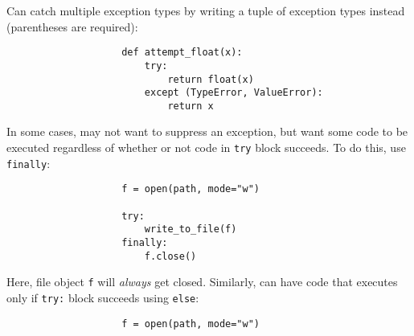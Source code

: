 \documentclass{article}
\begin{document}
\begin{enumerate}
\begin{itemize}
\begin{itemize}
\begin{itemize}
\begin{verbatim}
				\end{verbatim}
				Can catch multiple exception types by writing a tuple of exception types instead (parentheses are required):
				\begin{verbatim}
					def attempt_float(x):
					    try:
					        return float(x)
					    except (TypeError, ValueError):
					        return x
				\end{verbatim}
				In some cases, may not want to suppress an exception, but want some code to be executed regardless of whether or not code in {\tt try} block succeeds. To do this, use {\tt finally}:
				\begin{verbatim}
					f = open(path, mode="w")
					
					try:
					    write_to_file(f)
					finally:
					    f.close()
				\end{verbatim}
				Here, file object {\tt f} will {\it always} get closed. Similarly, can have code that executes only if {\tt try:} block succeeds using {\tt else}:
				\begin{verbatim}
					f = open(path, mode="w")
					

\end{verbatim}
\end{itemize}
\end{itemize}
\end{itemize}
\end{enumerate}
\end{document}
